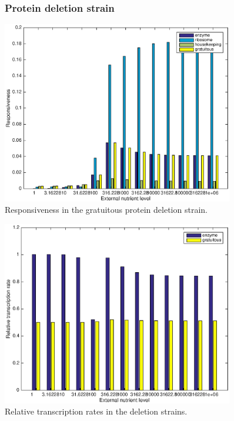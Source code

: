 \documentclass{beamer}
\begin{document}
\begin{frame}
\begin{figure}
\frametitle{Protein deletion strain}
\includegraphics[width=0.9\textwidth]{gratdel.eps}
\caption{Responsiveness in the gratuitous protein deletion strain.}
\end{figure}
\end{frame}

\begin{frame}
\begin{figure}
\includegraphics[width=0.9\textwidth]{reltransdel.eps}
\caption{Relative transcription rates in the deletion strains.}
\end{figure}
\end{frame}
\end{document}
